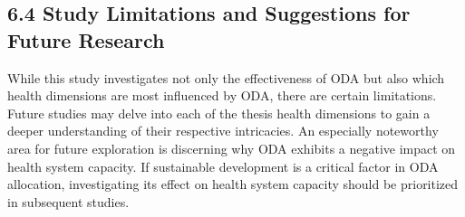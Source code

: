 
\subsection*{6.4 Study Limitations and Suggestions for Future Research}
While this study investigates not only the effectiveness of ODA but also which health dimensions are most influenced by ODA, there are certain limitations. Future studies may delve into each of the thesis health dimensions to gain a deeper understanding of their respective intricacies. An especially noteworthy area for future exploration is discerning why ODA exhibits a negative impact on health system capacity. If sustainable development is a critical factor in ODA allocation, investigating its effect on health system capacity should be prioritized in subsequent studies.

